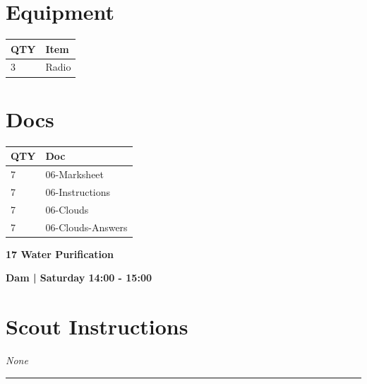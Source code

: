 \documentclass[10pt]{article}
\newcommand{\newtitle}[1]{\begin{center}{\Huge\bfseries #1 }\\ \vspace{5mm}\end{center}}
\newcommand{\newsubtitle}[1]{\begin{center}{\color{grey}\Large\bfseries #1 }\\ \vspace{5mm}\end{center}}
\begin{document}
	\begin{multicols}{2}

		\section*{\faWrench \: Equipment}

		
	\begin{center}
			\begin{tabular}{p{2cm}p{4cm}}


				\textbf{QTY} & \textbf{Item} \\\toprule
												3&Radio\\\midrule
								\end{tabular}

			\end{center}

		
		\vfill\null
		\columnbreak

			\section*{\faFile \: Docs}
		 	\begin{center}
			\begin{tabular}{p{2cm}p{4cm}}

			\textbf{QTY} & \textbf{Doc} \\\toprule
										7&06-Marksheet\\\midrule
										7&06-Instructions\\\midrule
										7&06-Clouds\\\midrule
										7&06-Clouds-Answers\\\midrule
							\end{tabular}
			\end{center}
	

		\vfill\null

		\end{multicols}



	\vspace{1cm}


	\clearpage
		\newtitle{17 Water Purification }
	\newsubtitle{Dam | Saturday 14:00 - 15:00}
		\setcounter{section}{16}
	\section*{Scout Instructions}
		\textit{None}
	
	\vspace{0.5cm}
	\hrule
	\vspace{0.5cm}
\end{document}
